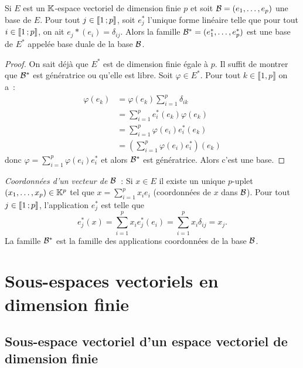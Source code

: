 \begin{prop}
  Si \(E\) est un \(\mathbb{K}\)-espace vectoriel de dimension finie \(p\) et soit \(\mathcal{B}=(e_1, \ldots, e_p)\) une base de \(E\). Pour tout \(j \in  \mathopen{\llbracket}1\mathclose{}\mathpunct{};p\mathclose{\rrbracket}\), soit \(e_j^*\) l'unique forme linéaire telle que pour tout \(i \in  \mathopen{\llbracket}1\mathclose{}\mathpunct{};p\mathclose{\rrbracket}\), on ait \(e_j*(e_i)=\delta_{ij}\). Alors la famille \(\mathcal{B}^* = (e_1^*, \ldots, e_p^*)\) est une base de \(E^*\) appelée base duale de la base \(\mathcal{B}\).
\end{prop}
\begin{proof}
  On sait déjà que \(E^*\) est de dimension finie égale à \(p\). Il suffit de montrer que \(\mathcal{B}^*\) est génératrice ou qu'elle est libre. Soit \(\varphi \in E^*\). Pour tout \(k \in \llbracket 1,p \rrbracket\) on a~:
  \begin{align}
    \varphi(e_k)&= \varphi(e_k) \sum_{i=1}^p \delta_{ik} \\
    &=\sum_{i=1}^p e_i^*(e_k) \varphi(e_k) \\
    &=\sum_{i=1}^p \varphi(e_i) e_i^*(e_k)  \\
    &=\left(\sum_{i=1}^p \varphi(e_i) e_i^* \right)(e_k)
  \end{align}
  donc \(\varphi = \sum_{i=1}^p \varphi(e_i) e_i^*\) et alors \(\mathcal{B}^*\) est génératrice. Alors c'est une base.
\end{proof}

\emph{Coordonnées d'un vecteur de \(\mathcal{B}\)}~: Si \(x \in E\) il existe un unique \(p\)-uplet \((x_1, \ldots, x_p) \in \mathbb{K}^p\) tel que \(x = \sum_{i=1}^p x_i e_i\) (coordonnées de \(x\) dans \(\mathcal{B}\)). Pour tout \(j \in  \mathopen{\llbracket}1\mathclose{}\mathpunct{};p\mathclose{\rrbracket}\), l'application \(e_j^*\) est telle que
\begin{equation}
  e_j^*(x)=\sum_{i=1}^p x_i e_j^*(e_i) = \sum_{i=1}^p x_i \delta_{ij} = x_j.
\end{equation}
La famille \(\mathcal{B}^*\) est la famille des applications coordonnées de la base \(\mathcal{B}\).

\section{Sous-espaces vectoriels en dimension finie}

\subsection{Sous-espace vectoriel d'un espace vectoriel de dimension finie}

